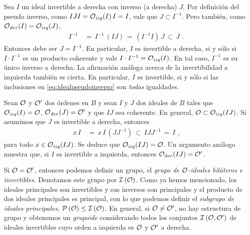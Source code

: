 Sea $I$ un ideal invertible a derecha con inverso (a derecha) $J$. Por
definici\'{o}n del pseudo inverso, como $IJI=\Oizq(I)\,I=I$, vale que
$J\subset I^{-1}$. Pero tambi\'{e}n, como $\Oder(I)=\Oizq(J)$,
\begin{align*}
	I^{-1} & \,=\,I^{-1}\,(IJ) \,=\,(I^{-1}I)\,J\,\subset\,J
	\text{ .}
\end{align*}
%
Entonces debe ser $J=I^{-1}$. En particular, $I$ es invertible a derecha, si y
s\'{o}lo si $I\cdot I^{-1}$ es un producto coherente y vale
$I\cdot I^{-1}=\Oizq(I)$. En tal caso, $I^{-1}$ es su \'{u}nico inverso a
derecha. La afirmaci\'{o}n an\'{a}loga acerca de la invertibilidad a izquierda
tambi\'{e}n es cierta. En particular, $I$ es invertible, si y s\'{o}lo si las
inclusiones en \eqref{eq:idealpseudoinverso} son \emph{todas} igualdades.

Sean $\cal{O}$ y $\cal{O}'$ dos \'{o}rdenes en $B$ y sean $I$ y $J$ dos ideales
de $B$ tales que $\Oizq(I)=\cal{O}$, $\Oder(J)=\cal{O}'$ y que $IJ$ sea
coherente. En general, $\cal{O}\subset\Oizq(IJ)$. Si asumimos que $J$ es
invertible a derecha, entonces
\begin{align*}
	x\,I & \,=\,x\,I\,(JJ^{-1})\,\subset\,IJJ^{-1}\,=\,I
	\text{ ,}
\end{align*}
%
para todo $x\in\Oizq(IJ)$. Se deduce que $\Oizq(IJ)=\cal{O}$. Un argumento
an\'{a}logo muestra que, si $I$ es invertible a izquierda, entonces
$\Oder(IJ)=\cal{O}'$.

Si $\cal{O}=\cal{O}'$, entonces podemos definir un grupo, el \emph{grupo de %
$\cal{O}$-ideales bil\'{a}teros e invertibles}.
Denotamos este grupo por $\ideales{\cal{O}}$. Como ya hemos mencionado, los
ideales principales son invertibles y sus inversos son principales y el
producto de dos ideales principales es principal, con lo que podemos definir el
\emph{subgrupo de ideales principales},
$\ppales{\cal{O}}\leq\ideales{\cal{O}}$.
En general, si $\cal{O}\not =\cal{O}'$, no hay estructura de grupo
y obtenemos un \emph{grupoide}
considerando todos los conjuntos $\ideales{\cal{O},\cal{O}'}$ de ideales
invertibles cuyo orden a izquierda es $\cal{O}$ y $\cal{O}'$ a derecha.

